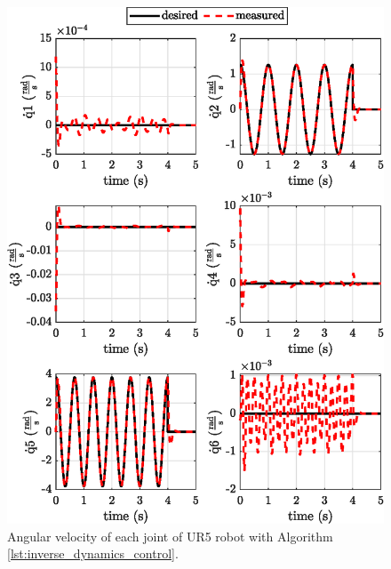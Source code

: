 \begin{figure}[H]
    \centering
    \includegraphics{images/act_2.1/joint_velocity.eps}
    \caption{Angular velocity of each joint of UR5 robot with Algorithm \ref{lst:inverse_dynamics_control}.}
    \label{fig:act_2.1_joint_velocity}
\end{figure}